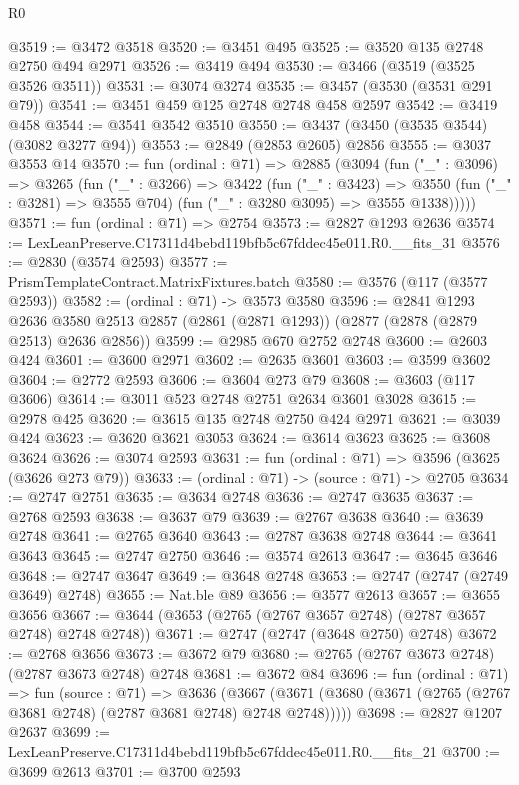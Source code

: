 \begin{lexlean}{R0}
\begin{coremodule}
@3519 := @3472 @3518
@3520 := @3451 @495
@3525 := @3520 @135 @2748 @2750 @494 @2971
@3526 := @3419 @494
@3530 := @3466 (@3519 (@3525 @3526 @3511))
@3531 := @3074 @3274
@3535 := @3457 (@3530 (@3531 @291 @79))
@3541 := @3451 @459 @125 @2748 @2748 @458 @2597
@3542 := @3419 @458
@3544 := @3541 @3542 @3510
@3550 := @3437 (@3450 (@3535 @3544) (@3082 @3277 @94))
@3553 := @2849 (@2853 @2605) @2856
@3555 := @3037 @3553 @14
@3570 := fun (ordinal : @71) =>
  @2885
    (@3094
      (fun ("_" : @3096) =>
      @3265
        (fun ("_" : @3266) =>
        @3422
          (fun ("_" : @3423) =>
          @3550 (fun ("_" : @3281) => @3555 @704) (fun ("_" : @3280 @3095) => @3555 @1338)))))
@3571 := fun (ordinal : @71) => @2754
@3573 := @2827 @1293 @2636
@3574 := LexLeanPreserve.C17311d4bebd119bfb5c67fddec45e011.R0.__fits_31
@3576 := @2830 (@3574 @2593)
@3577 := PrismTemplateContract.MatrixFixtures.batch
@3580 := @3576 (@117 (@3577 @2593))
@3582 := (ordinal : @71) -> @3573 @3580
@3596 := @2841
    @1293
    @2636
    @3580
    @2513
    @2857
    (@2861 (@2871 @1293))
    (@2877 (@2878 (@2879 @2513) @2636 @2856))
@3599 := @2985 @670 @2752 @2748
@3600 := @2603 @424
@3601 := @3600 @2971
@3602 := @2635 @3601
@3603 := @3599 @3602
@3604 := @2772 @2593
@3606 := @3604 @273 @79
@3608 := @3603 (@117 @3606)
@3614 := @3011 @523 @2748 @2751 @2634 @3601 @3028
@3615 := @2978 @425
@3620 := @3615 @135 @2748 @2750 @424 @2971
@3621 := @3039 @424
@3623 := @3620 @3621 @3053
@3624 := @3614 @3623
@3625 := @3608 @3624
@3626 := @3074 @2593
@3631 := fun (ordinal : @71) => @3596 (@3625 (@3626 @273 @79))
@3633 := (ordinal : @71) -> (source : @71) -> @2705
@3634 := @2747 @2751
@3635 := @3634 @2748
@3636 := @2747 @3635
@3637 := @2768 @2593
@3638 := @3637 @79
@3639 := @2767 @3638
@3640 := @3639 @2748
@3641 := @2765 @3640
@3643 := @2787 @3638 @2748
@3644 := @3641 @3643
@3645 := @2747 @2750
@3646 := @3574 @2613
@3647 := @3645 @3646
@3648 := @2747 @3647
@3649 := @3648 @2748
@3653 := @2747 (@2747 (@2749 @3649) @2748)
@3655 := Nat.ble @89
@3656 := @3577 @2613
@3657 := @3655 @3656
@3667 := @3644 (@3653 (@2765 (@2767 @3657 @2748) (@2787 @3657 @2748) @2748 @2748))
@3671 := @2747 (@2747 (@3648 @2750) @2748)
@3672 := @2768 @3656
@3673 := @3672 @79
@3680 := @2765 (@2767 @3673 @2748) (@2787 @3673 @2748) @2748
@3681 := @3672 @84
@3696 := fun (ordinal : @71) =>
  fun (source : @71) =>
  @3636 (@3667 (@3671 (@3680 (@3671 (@2765 (@2767 @3681 @2748) (@2787 @3681 @2748) @2748 @2748)))))
@3698 := @2827 @1207 @2637
@3699 := LexLeanPreserve.C17311d4bebd119bfb5c67fddec45e011.R0.__fits_21
@3700 := @3699 @2613
@3701 := @3700 @2593

\end{coremodule}
\end{lexlean}

